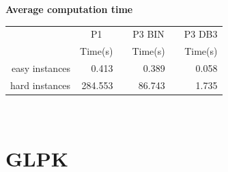\begin{center}
\textbf{Average computation time}
\end{center}
\begin{table}[h!]\centering
{}
\begin{tabular}{@{}rrcrcr@{}}\toprule
& \multicolumn{1}{c}{P1} & \phantom{abc} & \multicolumn{1}{c}{P3 BIN} & \phantom{abc} & \multicolumn{1}{c}{P3 DB3}\\
& Time(s) & & Time(s) & & Time(s)\\ \midrule
easy instances & 0.413 & & 0.389 & & 0.058 \\
hard instances & 284.553 & & 86.743 & & 1.735 \\
\bottomrule
\end{tabular}
\end{table}\ \\

\newpage
\section{GLPK}

